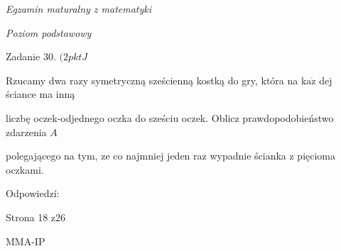 \documentclass[a4paper,12pt]{article}
\begin{document}
{\it Egzamin maturalny z matematyki}

{\it Poziom podstawowy}

Zadanie 30. $(2pktJ$

Rzucamy dwa razy symetryczną sześcienną kostką do gry, która na $\mathrm{k}\mathrm{a}\dot{\mathrm{z}}$ dej ściance ma inną

liczbę oczek-odjednego oczka do sześciu oczek. Oblicz prawdopodobieństwo zdarzenia $A$

polegającego na tym, ze co najmniej jeden raz wypadnie ścianka z pięcioma oczkami.

Odpowiedzí:

Strona 18 z26

MMA-IP
\end{document}
